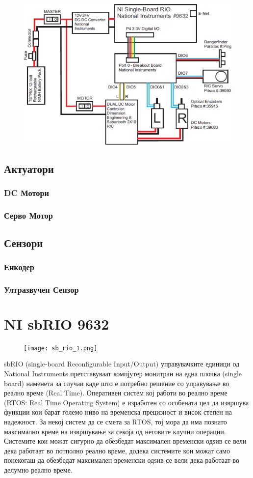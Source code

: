 \documentclass{article}
\begin{document}
\begin{figure}[h]
\includegraphics[width=0.75\linewidth]{dani_block_diagram.png}
\centering
\end{figure}

\subsection{Актуатори}
\subsubsection{DC Мотори}
\subsubsection{Серво Мотор}
\subsection{Сензори}
\subsubsection{Енкодер}
\subsubsection{Ултразвучен Сензор}

\section{NI sbRIO 9632}

\begin{figure}[h]
\texttt{[image: sb\_rio\_1.png]}
\centering
\end{figure}
sbRIO (single-board Reconfigurable Input/Output) управувачките единици од National Instruments претставуваат компјутер монитран на една плочка (single board) наменета за случаи каде што е потребно решение со управување во реално време (Real Time). Оперативен систем кој работи во реално време (RTOS: Real Time Operating System) е изработен со особената цел да извршува функции кои барат големо ниво на временска прецизност и висок степен на надежност. За некој систем да се смета за RTOS, тој мора да има познато максимално време на извршување за секоја од неговите клучни операции. Системите кои можат сигурно да обезбедат максимален временски одѕив се вели дека работаат во потполно реално време, додека системите кои можат само понекогаш да обезбедат максимален временски одѕив се вели дека работаат во делумно реално време.  
 
\end{document}
